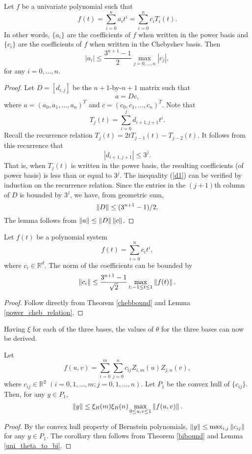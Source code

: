 \documentclass[12pt]{article}
\begin{document}
\begin{lemma}
\label{power_cheb_relation}
Let $f$ be a univariate polynomial such that
\[
f(t) = \sum_{i=0}^n a_i t^i = \sum_{i=0}^n c_i T_i(t).
\]
In other words, $\{ a_i \}$ are the coefficients of $f$ when written in the power
basis and $\{
c_i \}$ are the coefficients of $f$ when written in the Chebyshev basis.
Then
\[
|a_i| \leq \frac{3^{n+1}-1}{2} \max_{j=0,\ldots,n} |c_j|,
\]
for any $i=0,\ldots,n$.
\begin{proof}
Let $D = [d_{i,j}]$ be the $n+1$-by-$n+1$ matrix such that
\[
a = Dc,
\]
where $a = (a_0, a_1, \ldots, a_n)^T$ and $c =
(c_0, c_1, \ldots, c_n)^T$.  Note that
\[
T_j(t) = \sum_{i=0}^j d_{i+1,j+1}t^i.
\]
Recall the recurrence relation $T_j(t) = 2tT_{j-1}(t)-T_{j-2}(t)$.
It follows from this recurrence that
\begin{equation}
|d_{i+1,j+1}| \leq 3^j. \label{d1}
\end{equation}
That is, when $T_j(t)$ is written in the power basis, the resulting
coefficients (of power basis) is less than or equal to $3^j$.  The
inequality (\ref{d1}) can be verified by induction on the recurrence
relation.  Since the entries in the $(j+1)$th column of $D$ is
bounded by $3^j$, we have, from geometric sum,
\[
\left\|D\right\| \leq (3^{n+1}-1)/2.
\]
The lemma follows from $\left\|a\right\| \leq \left\|D\right\|\left\|c\right\|$.
\end{proof}
\end{lemma}
\begin{thm}
\label{powerbound} Let $f(t)$ be a polynomial system
\[
f(t) = \sum_{i=0}^n c_{i}t^i,
\]
where $c_{i} \in \mathbb{R}^d$. The norm of the coefficients
can be bounded by
\begin{equation}
\left\|c_{i}\right\| \leq  \frac{3^{n+1}-1}{\sqrt{2}} \max_{t : -1
\leq t \leq 1} \left\|f(t)\right\|.
\end{equation}
\end{thm}
\begin{proof}
Follow directly from Theorem \ref{chebbound} and Lemma \ref{power_cheb_relation}.
\end{proof}

Having $\xi$ for each of the three bases, the values of $\theta$ for
the three bases can now be derived.

\begin{cor}
Let
\[
f(u,v) = \sum_{i=0}^m \sum_{j=0}^n c_{ij}Z_{i,m}(u)Z_{j,n}(v),
\]
where $c_{ij} \in \mathbb{R}^2$ $(i=0,1,\ldots,m; j=0,1,\ldots,n)$.
Let $P_1$ be the convex hull of $\{ c_{ij} \}$. Then, for any $y \in P_1$,
\[
\left\|y\right\| \leq \xi_B(m) \xi_B(n) \max_{0 \leq u,v \leq 1}\left\|f(u,v)\right\|.
\]
\end{cor}
\begin{proof}
By the convex hull property of Bernstein polynomials, $\left\|y\right\| \leq \max_{i,j} \left\|c_{ij}\right\|$
for any $y \in P_1$.
The corollary then follows from Theorem \ref{bibound} and Lemma \ref{uni_theta_to_bi}.
\end{proof}
\end{document}
